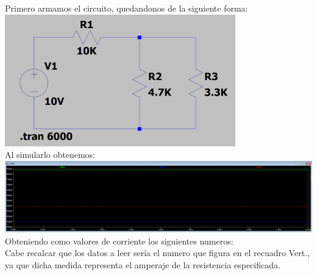 \documentclass[a4paper,12pt]{article}
\begin{document}
\vspace{5cm}
Primero armamos el circuito, quedandonos de la siguiente forma:\\[0.5cm]

\includegraphics[width=10cm]{imagenes/cirbuitoltspice.png}\\[1.5cm]

Al simularlo obtenemos:\\

\includegraphics[width=15cm]{imagenes/simulacionresultado.png}\\[1.5cm]

Obteniendo como valores de corriente los siguientes numeros:\\

Cabe recalcar que los datos a leer sería el numero que figura en el recuadro Vert., ya que dicha medida representa el amperaje de la resistencia especificada.
\end{document}
